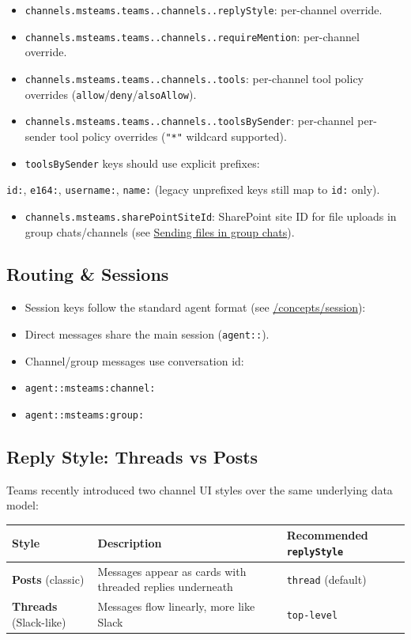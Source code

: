 \begin{itemize}
  \item \texttt{channels.msteams.teams..channels..replyStyle}: per-channel override.
  \item \texttt{channels.msteams.teams..channels..requireMention}: per-channel override.
  \item \texttt{channels.msteams.teams..channels..tools}: per-channel tool policy overrides (\texttt{allow}/\texttt{deny}/\texttt{alsoAllow}).
  \item \texttt{channels.msteams.teams..channels..toolsBySender}: per-channel per-sender tool policy overrides (\texttt{"*"} wildcard supported).
  \item \texttt{toolsBySender} keys should use explicit prefixes:
\end{itemize}

\texttt{id:}, \texttt{e164:}, \texttt{username:}, \texttt{name:} (legacy unprefixed keys still map to \texttt{id:} only).
\begin{itemize}
  \item \texttt{channels.msteams.sharePointSiteId}: SharePoint site ID for file uploads in group chats/channels (see \href{\#sending-files-in-group-chats}{Sending files in group chats}).
\end{itemize}


\subsection{Routing \& Sessions}


\begin{itemize}
  \item Session keys follow the standard agent format (see \href{/concepts/session}{/concepts/session}):
  \item Direct messages share the main session (\texttt{agent::}).
  \item Channel/group messages use conversation id:
  \item \texttt{agent::msteams:channel:}
  \item \texttt{agent::msteams:group:}
\end{itemize}


\subsection{Reply Style: Threads vs Posts}


Teams recently introduced two channel UI styles over the same underlying data model:


\begin{table}[h]
\centering
\small
\begin{tabular}{|l|l|l|}
\hline
Style & Description & Recommended \texttt{replyStyle} \\
\hline
\textbf{Posts} (classic) & Messages appear as cards with threaded replies underneath & \texttt{thread} (default) \\
\hline
\textbf{Threads} (Slack-like) & Messages flow linearly, more like Slack & \texttt{top-level} \\
\hline
\end{tabular}
\end{table}



